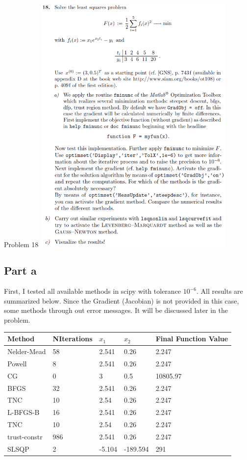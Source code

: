 \documentclass[10pt]{article}
\begin{document}
\begin{section}{Problem 18}
	\includegraphics[width=10cm]{img/problem18.png}
	\subsection{Part a}
	First, I tested all available methods in scipy with tolerance $10^{-6}$. All results are summarized below. Since the Gradient (Jacobian) is not provided in this case, some methods through out error messages. It will be discussed later in the problem. 
	
	
		\begin{tabular}{lllll}
			\hline
			Method & NIterations & $x_1$ & $x_2$& Final Function Value \\
			\hline\hline
			Nelder-Mead  & 58  & 2.541  & 0.26     & 2.247    \\
			Powell       & 8   & 2.541  & 0.26     & 2.247    \\
			CG           & 0   & 3      & 0.5      & 10805.97 \\
			BFGS         & 32  & 2.541  & 0.26     & 2.247    \\
			TNC          & 10  & 2.54   & 0.26     & 2.247    \\
			L-BFGS-B     & 16  & 2.541  & 0.26     & 2.247    \\
			TNC          & 10  & 2.54   & 0.26     & 2.247    \\
			trust-constr & 986 & 2.541  & 0.26     & 2.247    \\
			SLSQP        & 2   & -5.104 & -189.594 & 291     
		\end{tabular}
	

\end{section}
\end{document}
